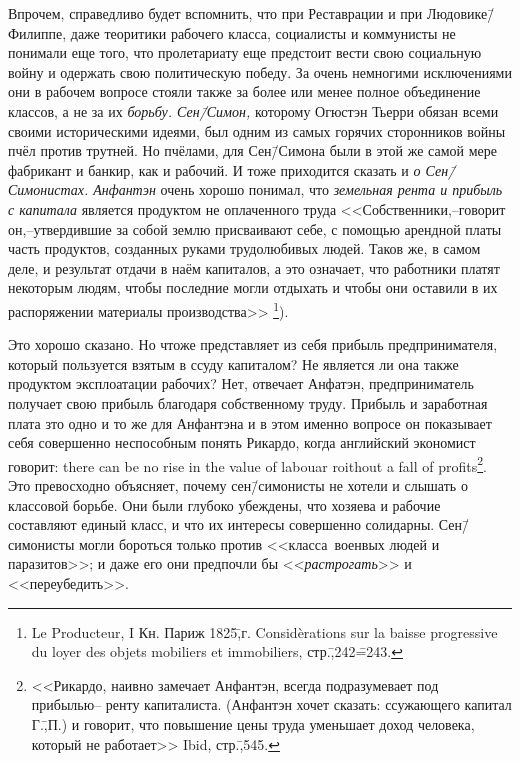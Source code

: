 Впрочем, справедливо будет вспомнить, что при Реставрации и при Людовике\=/Филиппе, даже теоритики рабочего класса, социалисты и коммунисты не понимали еще того, что пролетариату еще предстоит вести свою социальную войну и одержать свою политическую победу. За очень немногими исключениями они в рабочем вопросе стояли также за более или менее полное объединение классов, а не за их \emph{борьбу. Сен\=/Симон,} которому Огюстэн Тьерри обязан всеми своими историческими идеями, был одним из самых горячих сторонников войны пчёл против трутней. Но пчёлами, для Сен\=/Симона были в этой же самой мере фабрикант и банкир, как и рабочий. И тоже приходится сказать и \emph{о Сен\=/Симонистах. Анфантэн} очень хорошо понимал, что \emph{земельная рента и прибыль с капитала} является продуктом не оплаченного труда <<Собственники,\---говорит он,\---утвердившие за собой землю присваивают себе, с помощью арендной платы часть продуктов, созданных руками трудолюбивых людей. Таков же, в самом деле, и результат отдачи в наём капиталов, а это означает, что работники платят некоторым людям, чтобы последние могли отдыхать и чтобы они оставили в их распоряжении материалы производства>> \footnote{Le Producteur, I Кн. Париж 1825\=,г. Consid\`{e}rations sur la baisse progressive du loyer des objets mobiliers et immobiliers, стр.\=,242\==243.}).

Это хорошо сказано. Но чтоже представляет из себя прибыль предпринимателя, который пользуется взятым в ссуду капиталом? Не является ли она также продуктом эксплоатации рабочих? Нет, отвечает Анфатэн, предприниматель получает свою прибыль благодаря собственному труду. Прибыль и заработная плата зто одно и то же для Анфантэна и в этом именно вопросе он показывает себя совершенно неспособным понять Рикардо, когда английский экономист говорит: there can be no rise in the value of labouar roithout a fall of profits\footnote{<<Рикардо, наивно замечает Анфантэн, всегда подразумевает под прибылью\--- ренту капиталиста. (Анфантэн хочет сказать: ссужающего капитал Г.\=,П.) и говорит, что повышение цены труда уменьшает доход человека, который не работает>> Ibid, стр.\=,545.}. Это превосходно объясняет, почему сен\=/симонисты не хотели и слышать о классовой борьбе. Они были глубоко убеждены, что хозяева и рабочие составляют единый класс, и что их интересы совершенно солидарны. Сен\=/симонисты могли бороться только против <<\glqq класса\grqq\ военвых людей и паразитов>>; и даже его они предпочли бы <<\emph{растрогать}>> и <<переубедить>>.

